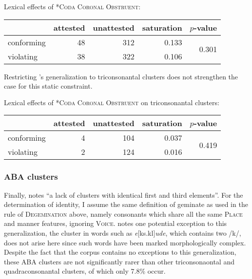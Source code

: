 \ex Lexical effects of \textsc{*Coda Coronal Obstruent}: \vspace{6pt} \\
\begin{tabular}{l r r r r}
\toprule
           & attested & unattested & saturation & $p$-value \\
\midrule
conforming &  48 & 312 & 0.133 & \multirow{2}{*}{0.301} \\
violating  &  38 & 322 & 0.106 \\
\bottomrule
\end{tabular}
\xe

Restricting \citeauthor{Pierrehumbert1994}'s generalization to triconsonantal clusters does not strengthen the case for this static constraint.

\ex Lexical effects of \textsc{*Coda Coronal Obstruent} on triconsonantal clusters: \vspace{6pt} \\
\begin{tabular}{l r r r r}
\toprule
           & attested & unattested & saturation & $p$-value \\
\midrule
conforming &  4 & 104 & 0.037 & \multirow{2}{*}{0.419} \\
violating  &  2 & 124 & 0.016 \\
\bottomrule
\end{tabular}
\xe



\subsubsection{ABA clusters}

Finally, \citet[][176]{Pierrehumbert1994} notes ``a lack of clusters with identical first and third elements''. For the determination of identity, I assume the same definition of geminate as used in the rule of \textsc{Degemination} above, namely consonants which share all the same \textsc{Place} and manner features, ignoring \textsc{Voice}. 
\citeauthor{Pierrehumbert1994} notes one potential exception to this generalization, the cluster in words such as \emph{e}[ks.kl]\emph{ude}, which contains two /k/, does not arise here since such words have been marked morphologically complex. Despite the fact that the corpus contains no exceptions to this generalization, these \textsc{ABA} clusters are not significantly rarer than other triconsonaontal and quadraconsonantal clusters, of which only 7.8\% occur. 

